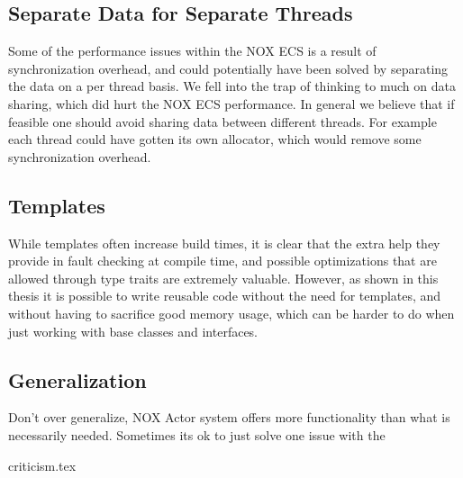 \subsection{Separate Data for Separate Threads}
Some of the performance issues within the NOX ECS is a result of synchronization overhead,
and could potentially have been solved by separating the data on a per thread basis.
We fell into the trap of thinking to much on data sharing, which did hurt the NOX ECS performance.
In general we believe that if feasible one should avoid sharing data between different threads.
For example each thread could have gotten its own allocator, which would remove some synchronization overhead.

\subsection{Templates}
While templates often increase build times, it is clear that the extra help they provide in
fault checking at compile time, and possible optimizations that are allowed through type traits
are extremely valuable.
However, as shown in this thesis it is possible to write reusable code without the need for templates,
and without having to sacrifice good memory usage, which can be harder to do when just working with
base classes and interfaces.

\subsection{Generalization}
Don't over generalize, NOX Actor system offers more functionality than what is necessarily needed.
Sometimes its ok to just solve one issue with the


{criticism.tex}
